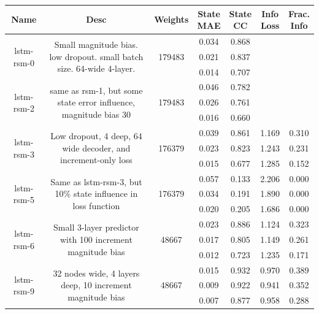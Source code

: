 \begin{table}[h!p]
    \footnotesize
    \centering
\begin{sideways}
    \begin{tabular}{c|c|c|c|c|c|c }
Name & Desc & Weights & \thead{State\\MAE} & \thead{State\\CC} & \thead{Info\\Loss} &\thead{Frac.\\Info}\\
\hline
\multirow{3}{6em}{lstm-rsm-0} & \multirow{3}{16em}{Small magnitude bias. low dropout. small batch size. 64-wide 4-layer.} & \multirow{3}{4em}{179483} & 0.034 & 0.868 &  &  \\ & & & 0.021 & 0.837 &  &  \\ & & & 0.014 & 0.707 &  &  \\
\hline
\multirow{3}{6em}{lstm-rsm-2} & \multirow{3}{16em}{same as rsm-1, but some state error influence, magnitude bias 30} & \multirow{3}{4em}{179483} & 0.046 & 0.782 &  &  \\ & & & 0.026 & 0.761 &  &  \\ & & & 0.016 & 0.660 &  &  \\
\hline
\multirow{3}{6em}{lstm-rsm-3} & \multirow{3}{16em}{Low dropout, 4 deep, 64 wide decoder, and increment-only loss} & \multirow{3}{4em}{176379} & 0.039 & 0.861 & 1.169 & 0.310 \\ & & & 0.023 & 0.823 & 1.243 & 0.231 \\ & & & 0.015 & 0.677 & 1.285 & 0.152 \\
\hline
\multirow{3}{6em}{lstm-rsm-5} & \multirow{3}{16em}{Same as lstm-rsm-3, but 10\% state influence in loss function} & \multirow{3}{4em}{176379} & 0.057 & 0.133 & 2.206 & 0.000 \\ & & & 0.034 & 0.191 & 1.890 & 0.000 \\ & & & 0.020 & 0.205 & 1.686 & 0.000 \\
\hline
\multirow{3}{6em}{lstm-rsm-6} & \multirow{3}{16em}{Small 3-layer predictor with 100 increment magnitude bias} & \multirow{3}{4em}{48667} & 0.023 & 0.886 & 1.124 & 0.323 \\ & & & 0.017 & 0.805 & 1.149 & 0.261 \\ & & & 0.012 & 0.723 & 1.235 & 0.171 \\
\hline
\multirow{3}{6em}{lstm-rsm-9} & \multirow{3}{16em}{32 nodes wide, 4 layers deep, 10 increment magnitude bias} & \multirow{3}{4em}{48667} & 0.015 & 0.932 & 0.970 & 0.389 \\ & & & 0.009 & 0.922 & 0.941 & 0.352 \\ & & & 0.007 & 0.877 & 0.958 & 0.288 \\

\end{tabular}
\end{sideways}
\end{table}
